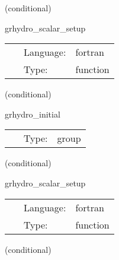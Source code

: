 \documentclass{article}
\begin{document}
\vspace{5mm}

   (conditional) 

\hspace{5mm} grhydro\_scalar\_setup 

\hspace{5mm}{\it set up and check scalars for efficiency } 


\hspace{5mm}

 \begin{tabular*}{160mm}{cll} 
~ & Language:  & fortran \\ 
~ & Type:  & function \\ 
\end{tabular*} 


\vspace{5mm}

   (conditional) 

\hspace{5mm} grhydro\_initial 

\hspace{5mm}{\it grhydro initial data group } 


\hspace{5mm}

 \begin{tabular*}{160mm}{cll} 
~ & Type:  & group \\ 
\end{tabular*} 


\vspace{5mm}

   (conditional) 

\hspace{5mm} grhydro\_scalar\_setup 

\hspace{5mm}{\it set up and check scalars for efficiency } 


\hspace{5mm}

 \begin{tabular*}{160mm}{cll} 
~ & Language:  & fortran \\ 
~ & Type:  & function \\ 
\end{tabular*} 


\vspace{5mm}

   (conditional) 
\end{document}

